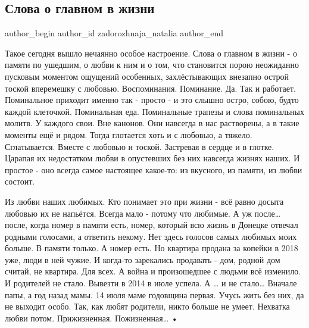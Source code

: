  
 
 
 
 
 
\subsection{Слова о главном в жизни}
\label{sec:07_07_2021.fb.zadorozhnaja_natalia.1.slova_o_glavnom_v_zhizni}
 
\ifcmt
 author_begin
   author_id zadorozhnaja_natalia
 author_end
\fi

\obeycr
Такое сегодня вышло нечаянно особое настроение.
Слова о главном в жизни - о памяти по ушедшим, о любви к ним и о том, что становится порою неожиданно пусковым моментом ощущений особенных, захлёстывающих внезапно острой тоской вперемешку с любовью.
Воспоминания.
Поминание.
Да. 
Так и работает.
Поминальное приходит именно так - просто - и это слышно остро, собою, будто каждой клеточкой.
Поминальная еда.
Поминальные трапезы и слова поминальных молитв.
У каждого свои. Вне канонов.
Они навсегда в нас растворены, а в такие моменты ещё и рядом. Тогда глотается хоть и с любовью, а тяжело. 
Сглатывается. 
Вместе с любовью и тоской. 
Застревая в сердце и в глотке. 
Царапая их недостатком любви в опустевших без них навсегда жизнях наших.
И простое - оно всегда самое настоящее какое-то: из вкусного, из памяти, из любви состоит. 
\restorecr


\obeycr
Из любви наших любимых. 
Кто понимает это при жизни - всё равно досыта любовью их не напьётся. Всегда мало - потому что любимые. А уж после… после, когда номер в памяти есть, номер, который всю жизнь в Донецке отвечал родными голосами, а ответить некому. Нет здесь голосов самых любимых моих больше. В памяти только. А номер есть. Но квартира продана за копейки в 2018 уже, люди в ней чужие. И когда-то зарекались продавать - дом, родной дом считай, не квартира. Для всех.
А война и произошедшее с людьми всё изменило.
И родителей не стало. Вывезти в 2014 в июле успела. 
А … 
и не стало… 
Вначале папы, а год назад мамы.
14 июля маме годовщина первая. 
Учусь жить без них, да не выходит особо. Так, как любят родители, никто больше не умеет. 
Нехватка любви потом.
Прижизненная.
Пожизненная…
•
\restorecr


